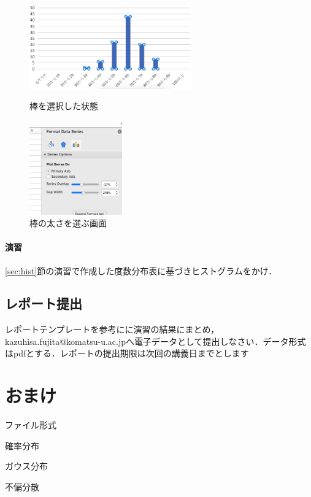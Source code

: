 \begin{figure}[htbp]
    \begin{minipage}{0.5\hsize}
        \centering
        \includegraphics[width=7cm]{chap1/select_bar_hist.png}
        \caption{棒を選択した状態}
        \label{fig:select_bar_hist}
    \end{minipage}
    \begin{minipage}{0.5\hsize}
        \centering
        \includegraphics[width=4cm]{chap1/select_width_hist.png}
        \caption{棒の太さを選ぶ画面}
        \label{fig:select_width_hist}
    \end{minipage}
\end{figure}


\paragraph{演習}

\ref{sec:hist}節の演習で作成した度数分布表に基づきヒストグラムをかけ．


\subsection{レポート提出}

レポートテンプレートを参考にに演習の結果にまとめ，kazuhisa.fujita@komatsu-u.ac.jpへ電子データとして提出しなさい．データ形式はpdfとする．レポートの提出期限は次回の講義日までとします

\section{おまけ}

ファイル形式

確率分布

ガウス分布

不偏分散
